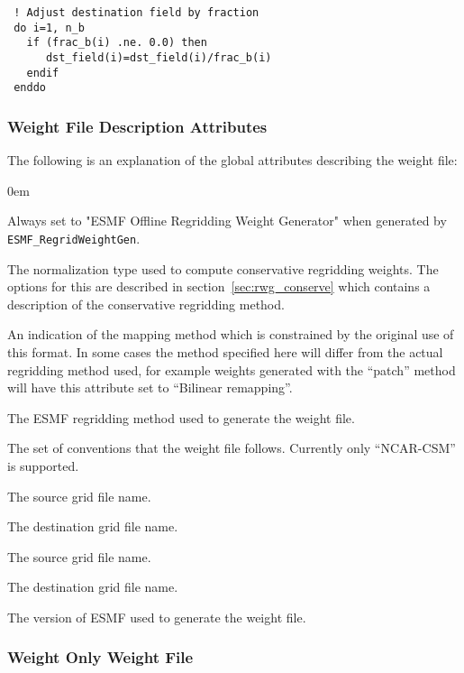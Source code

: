 \begin{verbatim}
 ! Adjust destination field by fraction
 do i=1, n_b
   if (frac_b(i) .ne. 0.0) then
      dst_field(i)=dst_field(i)/frac_b(i)
   endif
 enddo
\end{verbatim}


\subsubsection{Weight File Description Attributes}

The following is an explanation of the global attributes describing the weight file:
\begin{description}
  \itemsep0em
  \item[title] Always set to  "ESMF Offline Regridding Weight Generator" when generated by {\tt ESMF\_RegridWeightGen}.
  \item[normalization] The normalization type used to compute conservative regridding weights. The options for this are described in section~\ref{sec:rwg_conserve} which contains a description of the conservative regridding method.  
  \item[map\_method] An indication of the mapping method which is constrained by the original use of this format. In some cases the method specified here will differ from the actual regridding method used, for example weights generated with the ``patch'' method will have this attribute set to ``Bilinear remapping''. 
  \item[ESMF\_regrid\_method] The ESMF regridding method used to generate the weight file. 
  \item[conventions] The set of conventions that the weight file follows. Currently only ``NCAR-CSM'' is supported.
  \item[domain\_a] The source grid file name. 
  \item[domain\_b] The destination grid file name. 
  \item[grid\_file\_src] The source grid file name. 
  \item[grid\_file\_dst] The destination grid file name. 
  \item[CVS\_revision] The version of ESMF used to generate the weight file.
\end{description}

\subsubsection{Weight Only Weight File}


